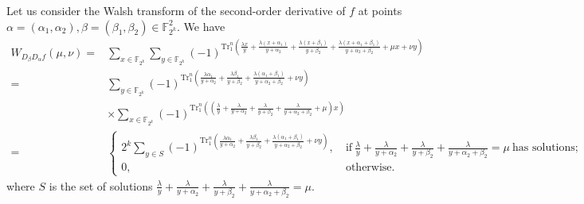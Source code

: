 \documentclass[runningheads,a4paper]{article}
\newcommand{\F}{\mathbb{F}}
\newcommand{\0}{\textbf{0}}
\newcommand{\1}{\textbf{1}}
\renewcommand{\Tr}{\mathrm{Tr}_1^n}
\renewcommand{\tr}{\mathrm{Tr}_1^k}
\begin{document}
Let us consider the Walsh transform of the second-order derivative of $f$ at points
$\alpha=(\alpha_1,\alpha_2),\beta=(\beta_1,\beta_2)\in\F_{2^k}^2$. We have
    \begin{align}\label{eq:secondordersum}
       W_{D_{\beta}D_{\alpha}f}(\mu,\nu)=&\sum_{x\in\F_{2^k}}\sum_{y\in\F_{2^k}}(-1)^{\Tr\left(\frac{\lambda x}{y}+\frac{\lambda (x+\alpha_1)}{y+\alpha_2}+\frac{\lambda (x+\beta_1)}{y+\beta_2}+\frac{\lambda (x+\alpha_1+\beta_1)}{y+\alpha_2+\beta_2}+\mu x+\nu y\right)}\nonumber\\
        =&\sum_{y\in\F_{2^k}}(-1)^{\Tr\left(\frac{\lambda\alpha_1}{y+\alpha_2}+\frac{\lambda\beta_1}{y+\beta_2}+\frac{\lambda(\alpha_1+\beta_1)}{y+\alpha_2+\beta_2}+\nu y\right)}\nonumber\\
        &\times \sum_{x\in\F_{2^k}}(-1)^{\Tr\left(\left(\frac{\lambda}{y}+\frac{\lambda}{y+\alpha_2}+\frac{\lambda}{y+\beta_2}+\frac{\lambda}{y+\alpha_2+\beta_2}+\mu\right)x\right)}\nonumber\\
        =&\begin{cases}
            2^k\sum_{y\in S}(-1)^{\Tr\left(\frac{\lambda\alpha_1}{y+\alpha_2}+\frac{\lambda\beta_1}{y+\beta_2}+\frac{\lambda(\alpha_1+\beta_1)}{y+\alpha_2+\beta_2}+\nu y\right)},&~\text{if}~\frac{\lambda}{y}+\frac{\lambda}{y+\alpha_2}+\frac{\lambda}{y+\beta_2}+\frac{\lambda}{y+\alpha_2+\beta_2}=\mu~\text{has solutions};\\
            0, &~\text{otherwise}.
        \end{cases}
    \end{align}
    where $ S $ is the set of solutions $ \frac{\lambda}{y}+\frac{\lambda}{y+\alpha_2}+\frac{\lambda}{y+\beta_2}+\frac{\lambda}{y+\alpha_2+\beta_2}=\mu $.
\end{document}
